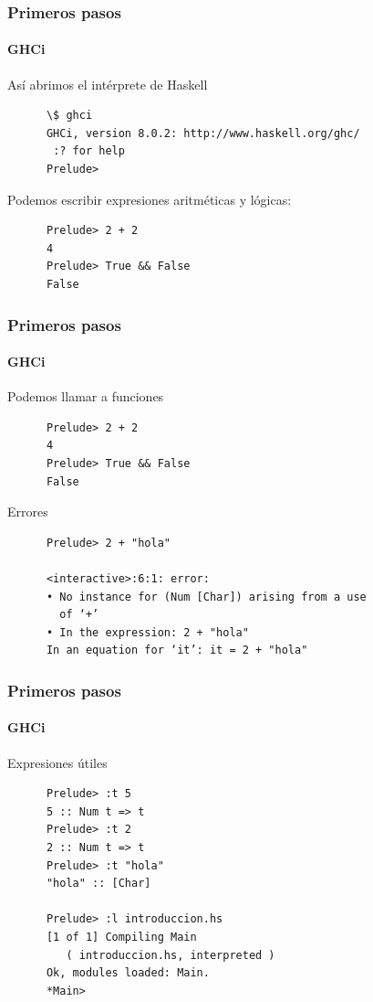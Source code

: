 \documentclass{beamer}
\begin{document}
\begin{frame}[fragile]
  \frametitle{Primeros pasos}
  \framesubtitle{GHCi}

  \begin{block}{Así abrimos el intérprete de Haskell}
    \begin{verbatim}
      \$ ghci
      GHCi, version 8.0.2: http://www.haskell.org/ghc/
       :? for help
      Prelude>
    \end{verbatim}
  \end{block}

  \begin{block}{Podemos escribir expresiones aritméticas y lógicas:}
    \begin{verbatim}
      Prelude> 2 + 2
      4
      Prelude> True && False
      False
    \end{verbatim}
  \end{block}

  
\end{frame}

\begin{frame}[fragile]
  \frametitle{Primeros pasos}
  \framesubtitle{GHCi}

  \begin{block}{Podemos llamar a funciones}
    \begin{verbatim}
      Prelude> 2 + 2
      4
      Prelude> True && False
      False
    \end{verbatim}
  \end{block}

  \begin{block}{Errores}
    \begin{verbatim}
      Prelude> 2 + "hola"

      <interactive>:6:1: error:
      • No instance for (Num [Char]) arising from a use
        of ‘+’
      • In the expression: 2 + "hola"
      In an equation for ‘it’: it = 2 + "hola"
    \end{verbatim}
  \end{block}
\end{frame}

\begin{frame}[fragile]
  \frametitle{Primeros pasos}
  \framesubtitle{GHCi}
  \begin{block}{Expresiones útiles}
    \begin{verbatim}
      Prelude> :t 5
      5 :: Num t => t
      Prelude> :t 2
      2 :: Num t => t
      Prelude> :t "hola"
      "hola" :: [Char]

      Prelude> :l introduccion.hs
      [1 of 1] Compiling Main
         ( introduccion.hs, interpreted )
      Ok, modules loaded: Main.
      *Main>
    \end{verbatim}
  \end{block}
\end{frame}
\end{document}
